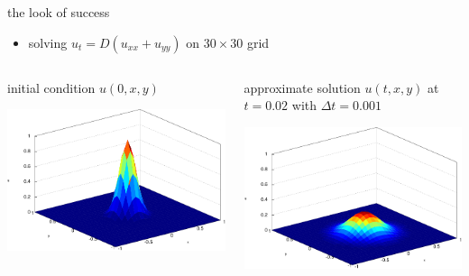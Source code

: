\begin{frame}{the look of success}

\begin{itemize}
\item solving $u_t = D(u_{xx} + u_{yy})$ on $30\times 30$ grid
\end{itemize}

\bigskip\bigskip
\begin{columns}
\begin{column}{0.5\textwidth}
initial condition $u(0,x,y)$

\bigskip
\begin{center}
\includegraphics[width=1.0\textwidth]{photos/initialheat}
\end{center}
\end{column}
\begin{column}{0.5\textwidth}
approximate solution $u(t,x,y)$ at $t=0.02$ with $\Delta t=0.001$ 

\bigskip
\begin{center}
\includegraphics[width=1.0\textwidth]{photos/finalheat}
\end{center}
\end{column}
\end{columns}
\end{frame}


